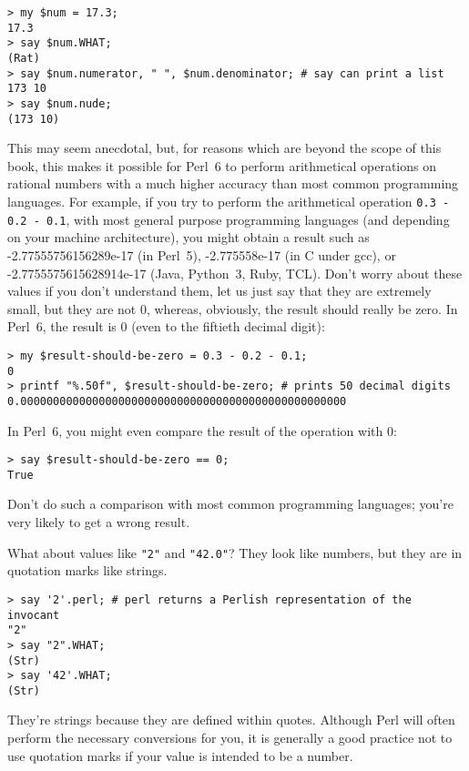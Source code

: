 \begin{verbatim}
> my $num = 17.3;
17.3
> say $num.WHAT;
(Rat)
> say $num.numerator, " ", $num.denominator; # say can print a list
173 10
> say $num.nude;
(173 10) 
\end{verbatim}
%
This may seem anecdotal, but, for reasons which are 
beyond the scope of this book, this makes it possible for Perl~6 
to perform arithmetical operations on rational numbers with 
a much higher accuracy than most common programming languages. 
For example, if you try to perform the arithmetical operation
\verb'0.3 - 0.2 - 0.1', with most general purpose programming languages 
(and depending on your machine architecture), you 
might obtain a result such as -2.77555756156289e-17 (in Perl~5), 
-2.775558e-17 (in C under gcc), or -2.7755575615628914e-17 
(Java, Python~3, Ruby, TCL). Don't worry about these values if you 
don't understand them, let us just say that they  are 
extremely small, but they are not 0, whereas,  
obviously, the result should really be zero. In Perl~6, 
the result is 0 (even to the fiftieth decimal digit):
\begin{verbatim}
> my $result-should-be-zero = 0.3 - 0.2 - 0.1;
0
> printf "%.50f", $result-should-be-zero; # prints 50 decimal digits
0.00000000000000000000000000000000000000000000000000
\end{verbatim}
%
In Perl~6, you might even compare the result of the operation with 0:
\begin{verbatim}
> say $result-should-be-zero == 0;
True
\end{verbatim}
%
Don't do such a comparison with most common programming 
languages; you're very likely to get a wrong result.

What about values like \verb'"2"' and \verb'"42.0"'?
They look like numbers, but they are in quotation marks like
strings.

\begin{verbatim}
> say '2'.perl; # perl returns a Perlish representation of the invocant
"2"
> say "2".WHAT;
(Str)
> say '42'.WHAT;
(Str)
\end{verbatim}
%

They're strings because they are defined within quotes. Although 
Perl will often perform the necessary conversions for you, it 
is generally a good practice not to use quotation marks if your value 
is intended to be a number.

